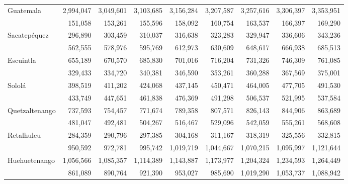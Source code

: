 {\begin{center}
\begin{tabular}{lrrrrrrrr}
			\multicolumn{1}{l}{Guatemala}	&	 2,994,047 	&	 3,049,601 	&	 3,103,685 	&	 3,156,284 	&	 3,207,587 	&	 3,257,616 	&	 3,306,397 	&	 3,353,951 	\\
			\rowcolor{color1!10!white} \multicolumn{1}{l}{El Progreso}	&	 151,058 	&	 153,261 	&	 155,596 	&	 158,092 	&	 160,754 	&	 163,537 	&	 166,397 	&	 169,290 	\\
			\multicolumn{1}{l}{Sacatepéquez}	&	 296,890 	&	 303,459 	&	 310,037 	&	 316,638 	&	 323,283 	&	 329,947 	&	 336,606 	&	 343,236 	\\
			\rowcolor{color1!10!white} \multicolumn{1}{l}{Chimaltenango}	&	 562,555 	&	 578,976 	&	 595,769 	&	 612,973 	&	 630,609 	&	 648,617 	&	 666,938 	&	 685,513 	\\
			\multicolumn{1}{l}{Escuintla}	&	 655,189 	&	 670,570 	&	 685,830 	&	 701,016 	&	 716,204 	&	 731,326 	&	 746,309 	&	 761,085 	\\
			\rowcolor{color1!10!white} \multicolumn{1}{l}{Santa Rosa}	&	 329,433 	&	 334,720 	&	 340,381 	&	 346,590 	&	 353,261 	&	 360,288 	&	 367,569 	&	 375,001 	\\
			\multicolumn{1}{l}{Sololá}	&	 398,519 	&	 411,202 	&	 424,068 	&	 437,145 	&	 450,471 	&	 464,005 	&	 477,705 	&	 491,530 	\\
			\rowcolor{color1!10!white} \multicolumn{1}{l}{Totonicapán}	&	 433,749 	&	 447,651 	&	 461,838 	&	 476,369 	&	 491,298 	&	 506,537 	&	 521,995 	&	 537,584 	\\
			\multicolumn{1}{l}{Quetzaltenango}	&	 737,593 	&	 754,457 	&	 771,674 	&	 789,358 	&	 807,571 	&	 826,143 	&	 844,906 	&	 863,689 	\\
		\rowcolor{color1!10!white} \multicolumn{1}{l}{Suchitepéquez}	&	 481,047 	&	 492,481 	&	 504,267 	&	 516,467 	&	 529,096 	&	 542,059 	&	 555,261 	&	 568,608 	\\
			\multicolumn{1}{l}{Retalhuleu}	&	 284,359 	&	 290,796 	&	 297,385 	&	 304,168 	&	 311,167 	&	 318,319 	&	 325,556 	&	 332,815 	\\
			\rowcolor{color1!10!white} \multicolumn{1}{l}{San Marcos}	&	 950,592 	&	 972,781 	&	 995,742 	&	 1,019,719 	&	 1,044,667 	&	 1,070,215 	&	 1,095,997 	&	 1,121,644 	\\
			\multicolumn{1}{l}{Huehuetenango}	&	 1,056,566 	&	 1,085,357 	&	 1,114,389 	&	 1,143,887 	&	 1,173,977 	&	 1,204,324 	&	 1,234,593 	&	 1,264,449 	\\
			\rowcolor{color1!10!white} \multicolumn{1}{l}{Quiché}	&	 861,089 	&	 890,764 	&	 921,390 	&	 953,027 	&	 985,690 	&	 1,019,290 	&	 1,053,737 	&	 1,088,942 	\\

\end{tabular}
\end{center}}
